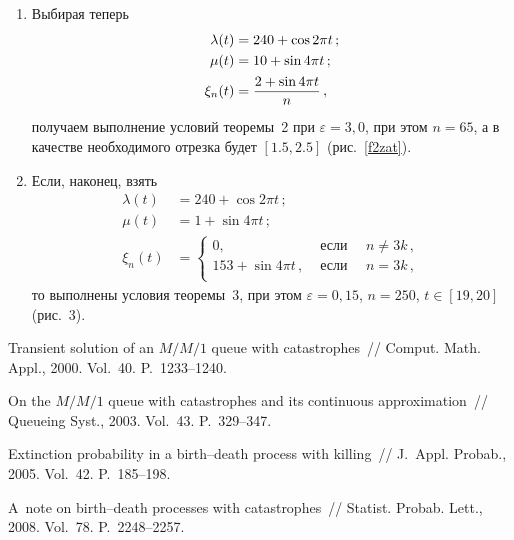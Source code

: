 \begin{multicols}{2}

\noindent
\begin{enumerate}[1.]
\addtocounter{enumi}{1}
\item
Выбирая теперь
\begin{align*}
 \lambda(t) &= 240+\cos 2\pi t\, ;\\
 \mu(t) &= 10 + \sin 4\pi t \,;\\
 \xi_n(t)&=\displaystyle\frac{\displaystyle 2 + \sin 4 \pi t\mathstrut}{\displaystyle n\mathstrut}\,,
 \end{align*}
получаем выполнение условий теоремы~2 при $\varepsilon =3{,}0$, при этом $n=65$, а
в качестве необходимого отрезка будет $[1.5,2.5]$ (рис.~\ref{f2zat}).
\item
Если, наконец, взять
\begin{align*}
\lambda(t)& = 240+\cos 2\pi t \,;\\
 \mu(t) &= 1 + \sin 4\pi t \,;\\
\xi_n(t) &=
\begin{cases}
0, & \mbox { если } \quad n \neq 3k\,, \\
153 + \sin 4 \pi t\,, & \mbox { если } \quad n = 3 k\,,\\
\end{cases}
\end{align*}
то выполнены условия теоремы~3, при этом  $\varepsilon =0{,}15$, $n=250$,
$t \in [19,20]$ (рис.~3).
\end{enumerate}


{\small\frenchspacing
{%
\begin{thebibliography}{9}

Transient solution of an $M/M/1$ queue with catastrophes~//  Comput. Math. Appl., 2000. Vol.~40. P.~1233--1240.

On the $M/M/1$ queue with catastrophes and its continuous approximation~//
 Queueing Syst., 2003. Vol.~43. P.~329--347.

Extinction probability in a birth--death process with killing~// J.~Appl. Probab., 2005. Vol.~42. P.~185--198.

A~note on birth--death processes with catastrophes~//
Statist. Probab. Lett., 2008. Vol.~78. P.~2248--2257.


\end{thebibliography}}}
\end{multicols}
